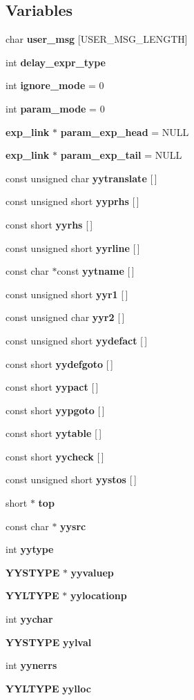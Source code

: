 \subsection*{Variables}
\begin{CompactItemize}
\item 
char {\bf user\_\-msg} [USER\_\-MSG\_\-LENGTH]
\item 
int {\bf delay\_\-expr\_\-type}
\item 
int {\bf ignore\_\-mode} = 0
\item 
int {\bf param\_\-mode} = 0
\item 
{\bf exp\_\-link} $\ast$ {\bf param\_\-exp\_\-head} = NULL
\item 
{\bf exp\_\-link} $\ast$ {\bf param\_\-exp\_\-tail} = NULL
\item 
const unsigned char {\bf yytranslate} [$\,$]
\item 
const unsigned short {\bf yyprhs} [$\,$]
\item 
const short {\bf yyrhs} [$\,$]
\item 
const unsigned short {\bf yyrline} [$\,$]
\item 
const char $\ast$const {\bf yytname} [$\,$]
\item 
const unsigned short {\bf yyr1} [$\,$]
\item 
const unsigned char {\bf yyr2} [$\,$]
\item 
const unsigned short {\bf yydefact} [$\,$]
\item 
const short {\bf yydefgoto} [$\,$]
\item 
const short {\bf yypact} [$\,$]
\item 
const short {\bf yypgoto} [$\,$]
\item 
const short {\bf yytable} [$\,$]
\item 
const short {\bf yycheck} [$\,$]
\item 
const unsigned short {\bf yystos} [$\,$]
\item 
short $\ast$ {\bf top}
\item 
const char $\ast$ {\bf yysrc}
\item 
int {\bf yytype}
\item 
{\bf YYSTYPE} $\ast$ {\bf yyvaluep}
\item 
{\bf YYLTYPE} $\ast$ {\bf yylocationp}
\item 
int {\bf yychar}
\item 
{\bf YYSTYPE} {\bf yylval}
\item 
int {\bf yynerrs}
\item 
{\bf YYLTYPE} {\bf yylloc}
\end{CompactItemize}


